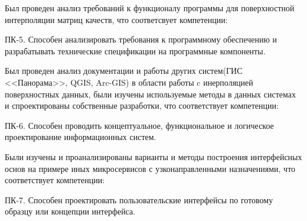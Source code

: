 Был проведен анализ требований к функционалу программы для поверхностной интерполяции матриц качеств, что соответсвует компетенции:

ПК-5. Способен анализировать требования к программному обеспечению
и разрабатывать технические спецификации на программные компоненты.

Был проведен анализ документации и работы других систем(ГИС <<Панорама>>, QGIS, Arc-GIS) в области работы c инерполяцией поверхностных данных, были изучены используемые методы в данных системах и спроектированы собственные разработки, что соответствует компетенции: 

ПК-6. Способен проводить концептуальное, функциональное и логическое
проектирование информационных систем.

Были изучены и проанализированы варианты и методы построения интерфейсных основ на примере иных микросервисов с узконаправленными назначениями, что соответствует компетенции:

ПК-7. Способен проектировать пользовательские интерфейсы по готовому
образцу или концепции интерфейса.

